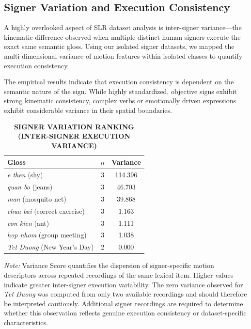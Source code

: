 \documentclass{ieeeaccess}
\begin{document}
\subsection{Signer Variation and Execution Consistency}
\label{sec:signer_variation}

A highly overlooked aspect of SLR dataset analysis is inter-signer variance—the kinematic difference observed when multiple distinct human signers execute the exact same semantic gloss. Using our isolated signer datasets, we mapped the multi-dimensional variance of motion features within isolated classes to quantify execution consistency.

The empirical results indicate that execution consistency is dependent on the semantic nature of the sign. While highly standardized, objective signs exhibit strong kinematic consistency, complex verbs or emotionally driven expressions exhibit considerable variance in their spatial boundaries. 

\begin{table}[!t]
\caption{\textbf{SIGNER VARIATION RANKING (INTER-SIGNER EXECUTION VARIANCE)}}
\label{tab:variation}

\centering
\small
\setlength{\tabcolsep}{10pt}

\begin{tabular}{|p{2.5cm}|c|c|}
\hline
\textbf{Gloss} &
\textbf{$n$} &
\textbf{Variance} \\
\hline
\emph{e then} (shy) & 3 & 114.396\\
\hline
\emph{quan bo} (jeans) & 3 & 46.703\\
\hline
\emph{man} (mosquito net) & 3 & 39.868\\
\hline
\emph{chua bai} (correct exercise) & 3 & 1.163\\
\hline
\emph{con kien} (ant) & 3 & 1.111\\
\hline
\emph{hop nhom} (group meeting) & 3 & 1.038\\
\hline
\emph{Tet Duong} (New Year's Day) & 2 & 0.000\\
\hline
\end{tabular}
\end{table}

\noindent
\footnotesize
\textit{Note:}
Variance Score quantifies the dispersion of signer-specific motion descriptors across repeated recordings of the same lexical item. Higher values indicate greater inter-signer execution variability. The zero variance observed for \emph{Tet Duong} was computed from only two available recordings and should therefore be interpreted cautiously. Additional signer recordings are required to determine whether this observation reflects genuine execution consistency or dataset-specific characteristics.
\end{document}
